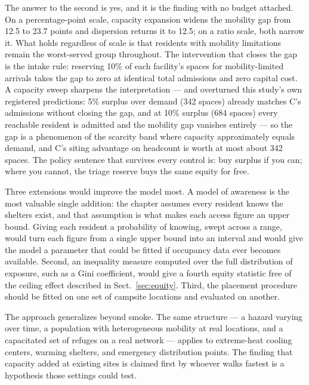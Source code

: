 \documentclass[graybox]{svmult}
\begin{document}
The answer to the second is yes, and it is the finding with no budget attached.
On a percentage-point scale, capacity expansion widens the mobility gap from
12.5 to 23.7 points and dispersion returns it to 12.5; on a ratio scale, both
narrow it. What holds regardless of scale is that residents with mobility
limitations remain the worst-served group throughout. The intervention that
closes the gap is the intake rule: reserving 10\% of each facility's spaces for
mobility-limited arrivals takes the gap to zero at identical total admissions
and zero capital cost. A capacity sweep sharpens the interpretation --- and
overturned this study's own registered predictions: 5\% surplus over demand
(342 spaces) already matches C's admissions without closing the gap, and at
10\% surplus (684 spaces) every reachable resident is admitted and the
mobility gap vanishes entirely --- so the gap is a phenomenon of the scarcity
band where capacity approximately equals demand, and C's siting advantage on
headcount is worth at most about 342 spaces. The policy sentence that survives every control is: buy surplus if you
can; where you cannot, the triage reserve buys the same equity for free.

Three extensions would improve the model most. A model of awareness is the most
valuable single addition: the chapter assumes every resident knows the shelters
exist, and that assumption is what makes each access figure an upper bound.
Giving each resident a probability of knowing, swept across a range, would turn
each figure from a single upper bound into an interval and would give the model a
parameter that could be fitted if occupancy data ever becomes available. Second,
an inequality measure computed over the full distribution of exposure, such as a
Gini coefficient, would give a fourth equity statistic free of the ceiling effect
described in Sect.~\ref{sec:equity}. Third, the placement
procedure should be fitted on one set of campsite locations and evaluated on
another.

The approach generalizes beyond smoke. The same structure --- a hazard varying
over time, a population with heterogeneous mobility at real locations, and a
capacitated set of refuges on a real network --- applies to extreme-heat cooling
centers, warming shelters, and emergency distribution points. The finding that
capacity added at existing sites is claimed first by whoever walks fastest is a
hypothesis those settings could test.
\end{document}
